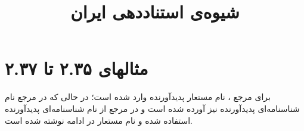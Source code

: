 \documentclass[a4paper,10pt]{article}
\def\examplenumber{مثالهای ۲.۳۵ تا ۲.۳۷}
\begin{document}
\title{شیوه‌ی استناددهی ایران}
\author{}
\date{}
\maketitle



\section*{\examplenumber}

برای مرجع \cite{یوشیج1383a}، نام مستعار پدیدآورنده وارد شده است؛ در حالی که در مرجع \cite{یوشیج1383b} نام شناسنا‌مه‌ای پدیدآورنده نیز آورده شده است و در مرجع \cite{اسفندیاری1383} از نام شناسنامه‌ای پدیدآورنده استفاده شده و نام مستعار در ادامه نوشته شده است.






\end{document}
